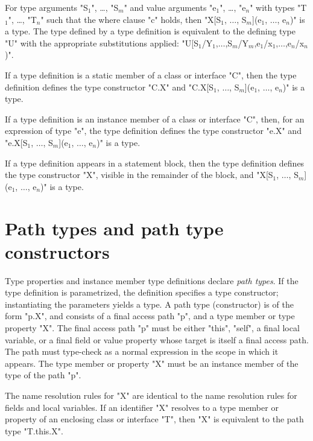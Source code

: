         For
        type arguments 
\xcdmath"S$_1$", \dots, \xcdmath"S$_m$"
and value arguments
\xcdmath"e$_1$", \dots, \xcdmath"e$_n$"
with types
\xcdmath"T$_1$", \dots, \xcdmath"T$_n$"
such that the where clause \xcd"c" holds, then
\xcdmath"X[S$_1$, $\dots$, S$_m$](e$_1$, $\dots$, e$_n$)"
is a type.
The type defined by a type definition is equivalent to 
the defining type \xcd"U" with the appropriate substitutions applied:
\xcdmath"U[S$_1$/Y$_1$,$\dots$,S$_m$/Y$_m$,e$_1$/x$_1$,$\dots$,e$_n$/x$_n$)".

        If a type definition 
        is a static member of a class or
        interface \xcd"C", then the type definition
        defines the type constructor \xcd"C.X"
and
\xcdmath"C.X[S$_1$, $\dots$, S$_m$](e$_1$, $\dots$, e$_n$)"
is a type.

        If a type definition 
        is an instance member of a class or
        interface \xcd"C", then, for an expression of type
        \xcd"e", the type definition
        defines the type constructor \xcd"e.X"
and
\xcdmath"e.X[S$_1$, $\dots$, S$_m$](e$_1$, $\dots$, e$_n$)"
is a type.

        If a type definition 
        appears in a statement block, then
        the type definition
        defines the type constructor \xcd"X", visible in the
        remainder of the block,
and
\xcdmath"X[S$_1$, $\dots$, S$_m$](e$_1$, $\dots$, e$_n$)"
is a type.

\section{Path types and path type constructors}


Type properties and instance member type definitions 
declare \emph{path types}.
If the type definition is parametrized, the definition specifies
a type constructor; instantiating the parameters yields a type.
A path type (constructor)
is of the form \xcd"p.X", and consists of a final access path
\xcd"p", and a type
member or type property \xcd"X".
The final access path \xcd"p" must be either \xcd"this", \xcd"self", a final
local variable, or a final field or value property whose target
is itself a final access path.  The path must type-check 
as a normal expression in the scope in which it appears.
The type member or property
\xcd"X" must be an instance member of the type of the
path \xcd"p".

The name resolution rules for \xcd"X" are identical to the name
resolution rules for fields and local variables.
If an identifier \xcd"X" resolves to a type member or property
of an enclosing class or interface \xcd"T", then \xcd"X" is equivalent to
the path type \xcd"T.this.X".

